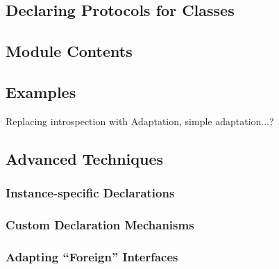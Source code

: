\documentclass{manual}
\begin{document}
\subsection{Declaring Protocols for Classes}

\subsection{Module Contents}

\subsection{Examples}
Replacing introspection with Adaptation, simple adaptation...?

\subsection{Advanced Techniques}
\subsubsection{Instance-specific Declarations}
\subsubsection{Custom Declaration Mechanisms}
\subsubsection{Adapting ``Foreign'' Interfaces}













%
%
%
\renewcommand{\indexname}{Module Index}

\renewcommand{\indexname}{Index}
\end{document}
